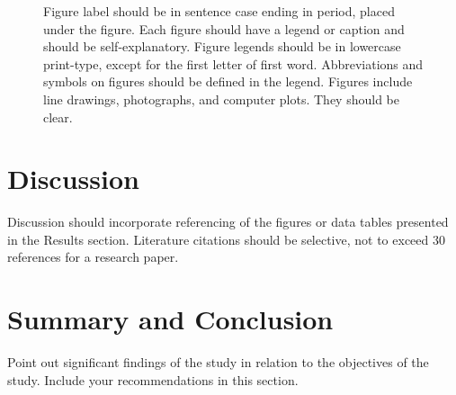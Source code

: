 \documentclass{strrespaper-journ}
\begin{document}
			\begin{figure}[htbp]
				\centering
				\caption{
					Figure label should be in sentence case ending in period, placed under the figure.
					Each figure should have a legend or caption and should be self-explanatory.
					Figure legends should be in lowercase print-type, except for the first letter of first word.
					Abbreviations and symbols on figures should be defined in the legend.
					Figures include line drawings, photographs, and computer plots.
					They should be clear.
				}
				\label{fig:bar_graph}
			\end{figure}

	\section{Discussion}
		Discussion should incorporate referencing of the figures or data tables presented in the Results section.
		Literature citations should be selective, not to exceed 30 references for a research paper.

	\section{Summary and Conclusion}
		Point out significant findings of the study in relation to the objectives of the study.
		Include your recommendations in this section.
\end{document}
